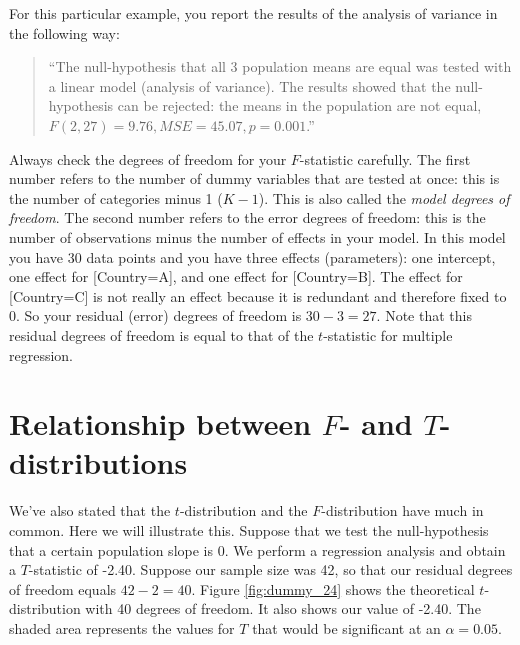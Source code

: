 \documentclass[]{report}\usepackage[]{graphicx}\usepackage[]{color}
\begin{document}
For this particular example, you report the results of the analysis of variance in the following way:

\begin{quote}
``The null-hypothesis that all 3 population means are equal was tested with a linear model (analysis of variance). The results showed that the null-hypothesis can be rejected: the means in the population are not equal, $F(2, 27) = 9.76, MSE = 45.07 , p = 0.001$.''
\end{quote}

Always check the degrees of freedom for your $F$-statistic carefully. The first number refers to the number of dummy variables that are tested at once: this is the number of categories minus 1 ($K-1$). This is also called the \textit{model degrees of freedom}. The second number refers to the error degrees of freedom: this is the number of observations minus the number of effects in your model. In this model you have 30 data points and you have three effects (parameters): one intercept, one effect for [Country=A], and one effect for [Country=B]. The effect for [Country=C] is not really an effect because it is redundant and therefore fixed to 0. So your residual (error) degrees of freedom is $30-3=27$. Note that this residual degrees of freedom is equal to that of the $t$-statistic for multiple regression.





\section{Relationship between $F$- and $T$-distributions}

We've also stated that the $t$-distribution and the $F$-distribution have much in common. Here we will illustrate this. Suppose that we test the null-hypothesis that a certain population slope is 0. We perform a regression analysis and obtain a $T$-statistic of -2.40. Suppose our sample size was 42, so that our residual degrees of freedom equals $42-2=40$. Figure \ref{fig:dummy_24} shows the theoretical $t$-distribution with 40 degrees of freedom. It also shows our value of -2.40. The shaded area represents the values for $T$ that would be significant at an $\alpha=0.05$.   
\end{document}
